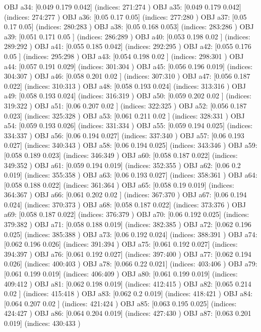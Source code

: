 OBJ a34: [0.049 0.179 0.042] (indices: 271:274 )
OBJ a35: [0.049 0.179 0.042] (indices: 274:277 )
OBJ a36: [0.05 0.17 0.05] (indices: 277:280 )
OBJ a37: [0.05 0.17 0.05] (indices: 280:283 )
OBJ a38: [0.05  0.168 0.053] (indices: 283:286 )
OBJ a39: [0.051 0.171 0.05 ] (indices: 286:289 )
OBJ a40: [0.053 0.198 0.02 ] (indices: 289:292 )
OBJ a41: [0.055 0.185 0.042] (indices: 292:295 )
OBJ a42: [0.055 0.176 0.05 ] (indices: 295:298 )
OBJ a43: [0.054 0.198 0.02 ] (indices: 298:301 )
OBJ a44: [0.057 0.191 0.029] (indices: 301:304 )
OBJ a45: [0.056 0.196 0.019] (indices: 304:307 )
OBJ a46: [0.058 0.201 0.02 ] (indices: 307:310 )
OBJ a47: [0.056 0.187 0.022] (indices: 310:313 )
OBJ a48: [0.058 0.193 0.024] (indices: 313:316 )
OBJ a49: [0.058 0.193 0.024] (indices: 316:319 )
OBJ a50: [0.059 0.202 0.02 ] (indices: 319:322 )
OBJ a51: [0.06  0.207 0.02 ] (indices: 322:325 )
OBJ a52: [0.056 0.187 0.023] (indices: 325:328 )
OBJ a53: [0.061 0.211 0.02 ] (indices: 328:331 )
OBJ a54: [0.059 0.193 0.026] (indices: 331:334 )
OBJ a55: [0.059 0.194 0.025] (indices: 334:337 )
OBJ a56: [0.06  0.194 0.027] (indices: 337:340 )
OBJ a57: [0.06  0.193 0.027] (indices: 340:343 )
OBJ a58: [0.06  0.194 0.025] (indices: 343:346 )
OBJ a59: [0.058 0.189 0.023] (indices: 346:349 )
OBJ a60: [0.058 0.187 0.022] (indices: 349:352 )
OBJ a61: [0.059 0.194 0.019] (indices: 352:355 )
OBJ a62: [0.06  0.2   0.019] (indices: 355:358 )
OBJ a63: [0.06  0.193 0.027] (indices: 358:361 )
OBJ a64: [0.058 0.188 0.022] (indices: 361:364 )
OBJ a65: [0.058 0.19  0.019] (indices: 364:367 )
OBJ a66: [0.061 0.202 0.02 ] (indices: 367:370 )
OBJ a67: [0.06  0.194 0.024] (indices: 370:373 )
OBJ a68: [0.058 0.187 0.022] (indices: 373:376 )
OBJ a69: [0.058 0.187 0.022] (indices: 376:379 )
OBJ a70: [0.06  0.192 0.025] (indices: 379:382 )
OBJ a71: [0.058 0.188 0.019] (indices: 382:385 )
OBJ a72: [0.062 0.196 0.025] (indices: 385:388 )
OBJ a73: [0.06  0.192 0.024] (indices: 388:391 )
OBJ a74: [0.062 0.196 0.026] (indices: 391:394 )
OBJ a75: [0.061 0.192 0.027] (indices: 394:397 )
OBJ a76: [0.061 0.192 0.027] (indices: 397:400 )
OBJ a77: [0.062 0.194 0.026] (indices: 400:403 )
OBJ a78: [0.066 0.22  0.021] (indices: 403:406 )
OBJ a79: [0.061 0.199 0.019] (indices: 406:409 )
OBJ a80: [0.061 0.199 0.019] (indices: 409:412 )
OBJ a81: [0.062 0.198 0.019] (indices: 412:415 )
OBJ a82: [0.065 0.214 0.02 ] (indices: 415:418 )
OBJ a83: [0.062 0.2   0.019] (indices: 418:421 )
OBJ a84: [0.064 0.207 0.02 ] (indices: 421:424 )
OBJ a85: [0.063 0.195 0.025] (indices: 424:427 )
OBJ a86: [0.064 0.204 0.019] (indices: 427:430 )
OBJ a87: [0.063 0.201 0.019] (indices: 430:433 )
